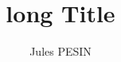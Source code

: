\def\authors{Jules PESIN}
\def\longTitle{long Title}
\def\shortTitle{short Title}

\author{\authors}
\title[\shortTitle]{\longTitle}
